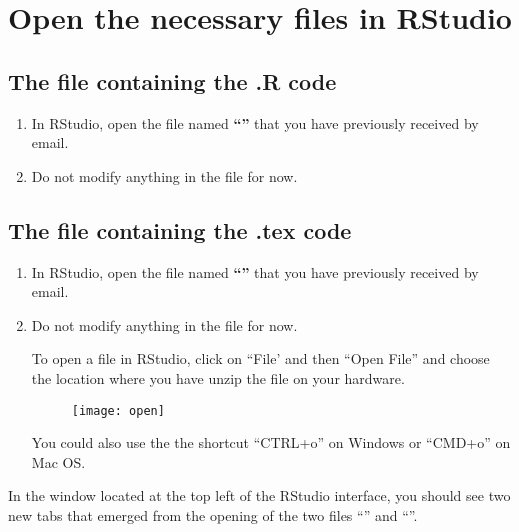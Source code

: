 \documentclass[11pt]{article}
\begin{document}
\section{Open the necessary files in RStudio} %
\label{sec:rstudio}

    \subsection{The file containing the .R code} %
        \begin{enumerate}
          \item In RStudio, open the file named \textbf{``''} that you have previously received by email.          
          \item Do not modify anything in the file for now.
        \end{enumerate}

    \subsection{The file containing the .tex code} %
        \begin{enumerate}
            \item In RStudio, open the file named \textbf{``''} that you have previously received by email.          
            \item Do not modify anything in the file for now.

            \begin{tips}
                To open a file in RStudio, click on ``File' and then ``Open File'' and choose the location where you have unzip the file \R on your hardware.
                \begin{figure}[H]
                	\centering
                	\texttt{[image: open]}
                \end{figure}
                You could also use the the shortcut ``CTRL+o'' on Windows or ``CMD+o'' on Mac OS.
            \end{tips}
        \end{enumerate}

\newpage

    In the window located at the top left of the RStudio interface, you should see two new tabs that emerged from the opening of the two files ``\textbf{}'' and ``\textbf{}''.
\end{document}
